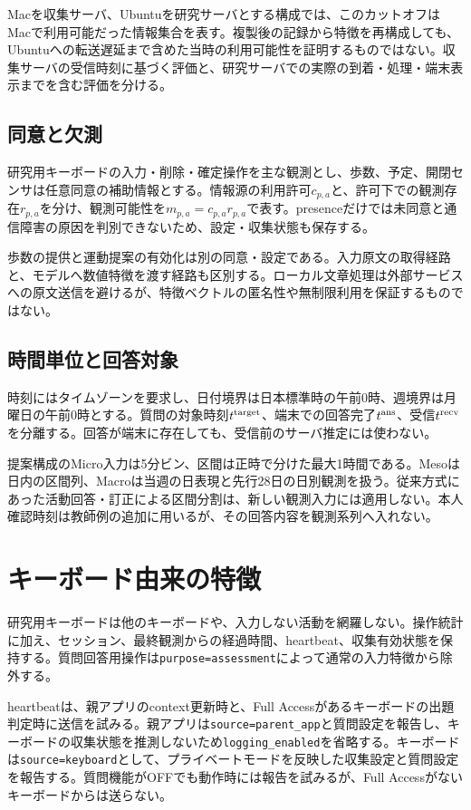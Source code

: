 Macを収集サーバ、Ubuntuを研究サーバとする構成では、このカットオフはMacで利用可能だった情報集合を表す。複製後の記録から特徴を再構成しても、Ubuntuへの転送遅延まで含めた当時の利用可能性を証明するものではない。収集サーバの受信時刻に基づく評価と、研究サーバでの実際の到着・処理・端末表示までを含む評価を分ける。

\subsection{同意と欠測}

研究用キーボードの入力・削除・確定操作を主な観測とし、歩数、予定、開閉センサは任意同意の補助情報とする。情報源の利用許可\(c_{p,a}\)と、許可下での観測存在\(r_{p,a}\)を分け、観測可能性を\(m_{p,a}=c_{p,a}r_{p,a}\)で表す。presenceだけでは未同意と通信障害の原因を判別できないため、設定・収集状態も保存する。

歩数の提供と運動提案の有効化は別の同意・設定である。入力原文の取得経路と、モデルへ数値特徴を渡す経路も区別する。ローカル文章処理は外部サービスへの原文送信を避けるが、特徴ベクトルの匿名性や無制限利用を保証するものではない。

\subsection{時間単位と回答対象}

時刻にはタイムゾーンを要求し、日付境界は日本標準時の午前0時、週境界は月曜日の午前0時とする。質問の対象時刻\(t^{\rm target}\)、端末での回答完了\(t^{\rm ans}\)、受信\(t^{\rm recv}\)を分離する。回答が端末に存在しても、受信前のサーバ推定には使わない。

提案構成のMicro入力は5分ビン、区間は正時で分けた最大1時間である。Mesoは日内の区間列、Macroは当週の日表現と先行28日の日別観測を扱う。従来方式にあった活動回答・訂正による区間分割は、新しい観測入力には適用しない。本人確認時刻は教師例の追加に用いるが、その回答内容を観測系列へ入れない。

\section{キーボード由来の特徴}
\label{sec:keyboard-features}

研究用キーボードは他のキーボードや、入力しない活動を網羅しない。操作統計に加え、セッション、最終観測からの経過時間、heartbeat、収集有効状態を保持する。質問回答用操作は\texttt{purpose=assessment}によって通常の入力特徴から除外する。

heartbeatは、親アプリのcontext更新時と、Full Accessがあるキーボードの出題判定時に送信を試みる。親アプリは\texttt{source=parent\_app}と質問設定を報告し、キーボードの収集状態を推測しないため\texttt{logging\_enabled}を省略する。キーボードは\texttt{source=keyboard}として、プライベートモードを反映した収集設定と質問設定を報告する。質問機能がOFFでも動作時には報告を試みるが、Full Accessがないキーボードからは送らない。

